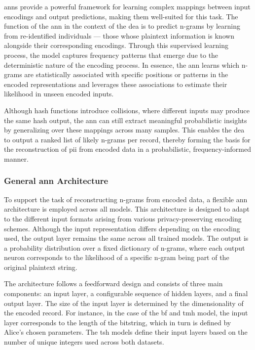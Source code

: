 \ac{ann}s provide a powerful framework for learning complex mappings between input encodings and output predictions, making them well-suited for this task.
The function of the \ac{ann} in the context of the \ac{dea} is to predict n-grams by learning from re-identified individuals — those whose plaintext information is known alongside their corresponding encodings.
Through this supervised learning process, the model captures frequency patterns that emerge due to the deterministic nature of the encoding process.
In essence, the \ac{ann} learns which n-grams are statistically associated with specific positions or patterns in the encoded representations and leverages these associations to estimate their likelihood in unseen encoded inputs.

Although hash functions introduce collisions, where different inputs may produce the same hash output, the \ac{ann} can still extract meaningful probabilistic insights by generalizing over these mappings across many samples.
This enables the \ac{dea} to output a ranked list of likely n-grams per record, thereby forming the basis for the reconstruction of \ac{pii} from encoded data in a probabilistic, frequency-informed manner.


\subsubsection{General \ac{ann} Architecture}

To support the task of reconstructing n-grams from encoded data, a flexible \ac{ann} architecture is employed across all models.
This architecture is designed to adapt to the different input formats arising from various privacy-preserving encoding schemes.
Although the input representation differs depending on the encoding used, the output layer remains the same across all trained models.
The output is a probability distribution over a fixed dictionary of n-grams, where each output neuron corresponds to the likelihood of a specific n-gram being part of the original plaintext string.

The architecture follows a feedforward design and consists of three main components: an input layer, a configurable sequence of hidden layers, and a final output layer.
The size of the input layer is determined by the dimensionality of the encoded record.
For instance, in the case of the \ac{bf} and \ac{tmh} model, the input layer corresponds to the length of the bitstring, which in turn is defined by Alice’s chosen parameters.
The \ac{tsh} models define their input layers based on the number of unique integers used across both datasets.

